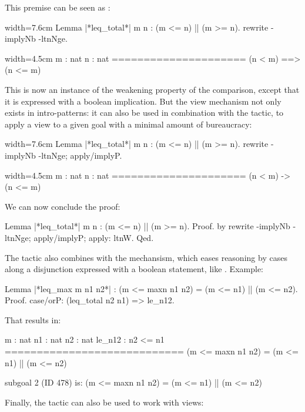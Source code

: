 This premise can be seen as :

\begin{coq}{}{width=7.6cm}
Lemma |*leq_total*| m n : (m <= n) || (m >= n).
rewrite -implyNb -ltnNge.
\end{coq}
\begin{coqout}{}{width=4.5cm}
m : nat
n : nat
=====================
(n < m) ==> (n <= m)
\end{coqout}

This is now an instance of the weakening property of the comparison,
except that it is expressed with a boolean implication. But the view
mechanism not only exists in intro-patterns: it can also be used in
combination with the  tactic, to apply a view to a given goal
with a minimal amount of bureaucracy:

\begin{coq}{}{width=7.6cm}
Lemma |*leq_total*| m n : (m <= n) || (m >= n).
rewrite -implyNb -ltnNge; apply/implyP.
\end{coq}
\begin{coqout}{}{width=4.5cm}
m : nat
n : nat
=====================
(n < m) -> (n <= m)
\end{coqout}

We can now conclude the proof:

\begin{coq}{}{}
Lemma |*leq_total*| m n : (m <= n) || (m >= n).
Proof. by rewrite -implyNb -ltnNge; apply/implyP; apply: ltnW. Qed.
\end{coq}

The  tactic also combines with the  mechansism, which
eases reasoning by cases along a disjunction expressed with a boolean
statement, like . Example:

\begin{coq}{}{}
Lemma |*leq_max m n1 n2*| :
  (m <= maxn n1 n2) = (m <= n1) || (m <= n2).
Proof.
case/orP: (leq_total n2 n1) => le_n12.
\end{coq}

That results in:

\begin{coqout}{}{}
m : nat
n1 : nat
n2 : nat
le_n12 : n2 <= n1
============================
(m <= maxn n1 n2) = (m <= n1) || (m <= n2)

subgoal 2 (ID 478) is:
 (m <= maxn n1 n2) = (m <= n1) || (m <= n2)
\end{coqout}

Finally, the  tactic can also be used to work with views:

